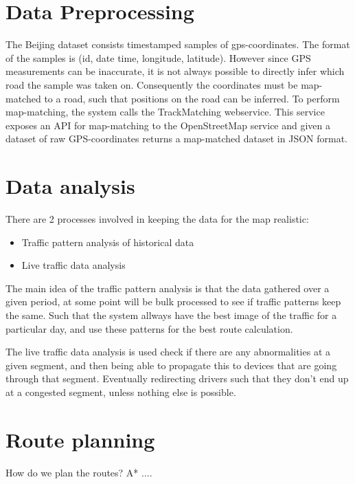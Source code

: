 \section{Data Preprocessing}
The Beijing dataset consists timestamped samples of gps-coordinates. The format of the samples is (id, date time, longitude, latitude). However since GPS measurements can be inaccurate, it is not always possible to directly infer which road the sample was taken on. Consequently the coordinates must be map-matched to a road, such that positions on the road can be inferred. To perform map-matching, the system calls the TrackMatching webservice\cite{TrackMatching}. This service exposes an API for map-matching to the OpenStreetMap service and given a dataset of raw GPS-coordinates returns a map-matched dataset in JSON format. 
\section{Data analysis}
There are 2 processes involved in keeping the data for the map realistic:
\begin{itemize}
	\item Traffic pattern analysis of historical data
	\item Live traffic data analysis
\end{itemize}

The main idea of the traffic pattern analysis is that the data gathered over a given period, at some point will be bulk processed to see if traffic patterns keep the same. Such that the system allways have the best image of the traffic for a particular day, and use these patterns for the best route calculation.

The live traffic data analysis is used check if there are any abnormalities at a given segment, and then being able to propagate this to devices that are going through that segment. Eventually redirecting drivers such that they don't end up at a congested segment, unless nothing else is possible.
\section{Route planning}
How do we plan the routes? A* ....